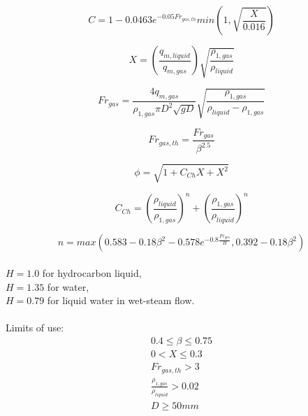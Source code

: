 \documentclass[journal]{IEEEtran}
\begin{document}
\begin{equation}
    C = 1 - 0.0463 e^{-0.05 Fr_{gas,th}} min \left( 1, \sqrt{\frac{X}{0.016}} \right )
\end{equation}

\begin{equation}
    X = \left( \frac{q_{m,liquid}}{q_{m,gas}} \right)\sqrt{\frac{\rho_{1,gas}}{\rho_{liquid}}}
\end{equation}

\begin{equation}
    Fr_{gas} = \frac{4q_{m,gas}}{\rho_{1,gas} \pi D^{2} \sqrt{gD}} \sqrt{\frac{\rho_{1,gas}}{\rho_{liquid}-\rho_{1,gas}}}
\end{equation}

\begin{equation}
    Fr_{gas,th} = \frac{Fr_{gas}}{\beta ^{2.5}}
\end{equation}

\begin{equation}
    \phi = \sqrt{1+C_{Ch}X+X^2}
\end{equation}

\begin{equation}
    C_{Ch} = \left( \frac{\rho_{liquid}}{\rho_{1,gas}} \right) ^{n} +\left( \frac{\rho_{1,gas}}{\rho_{liquid}} \right) ^{n}
\end{equation}

\begin{equation}
    n = max \left( 0.583 - 0.18 \beta^{2} - 0.578 e^{-0.8 \frac{Fr_{gas}}{H}}, 0.392 - 0.18 \beta^{2} \right)
\end{equation}
\\
$H = 1.0$ for hydrocarbon liquid,\\
$H = 1.35$ for water,\\
$H = 0.79$ for liquid water in wet-steam flow.
\\
\\
Limits of use: \\
\begin{equation*}
\begin{aligned}
    0.4 \leq \beta \leq 0.75 \\
    0 < X \leq 0.3 \\
    Fr_{gas,th} > 3 \\
    \frac{\rho_{1,gas}}{\rho_{liquid}} > 0.02 \\
    D \geq 50 mm
\end{aligned}
\end{equation*}
\end{document}
